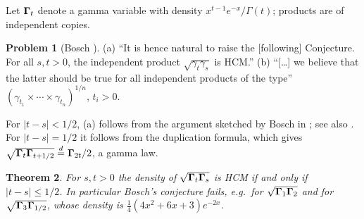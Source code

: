 \documentclass[11pt]{amsart}
\newtheorem{theorem}{Theorem}[section]
\theoremstyle{definition}
\newtheorem{problem}[theorem]{Problem}
\theoremstyle{remark}
\begin{document}
Let $\boldsymbol{\Gamma}_t$ denote a gamma variable with density
$x^{t-1}e^{-x}/\Gamma(t)$; products are of independent copies.

\begin{problem}[{Bosch \cite[Remark~1]{R7-Bosch15}}]\label{R7-prob-bosch}
(a) ``It is hence natural to raise the [following] Conjecture. For all
$s,t>0$, the independent product $\sqrt{\gamma_t\gamma_s}$ is HCM.''
(b) ``[\dots] we believe that the latter should be true for all independent
products of the type'' $(\gamma_{t_1}\times\cdots\times\gamma_{t_n})^{1/n}$,
$t_i>0$.
\end{problem}

For $|t-s|<1/2$, (a) follows from the argument sketched by Bosch in
\cite[Remark~1(a)]{R7-Bosch15}; see also \cite[Section~3.3]{R7-BoschSimon15}.
For $|t-s|=1/2$ it follows from the duplication formula, which gives
$\sqrt{\boldsymbol{\Gamma}_t\boldsymbol{\Gamma}_{t+1/2}}\overset d=\boldsymbol{\Gamma}_{2t}/2$, a gamma law.

\begin{theorem}\label{R7-thm-bosch}
For $s,t>0$ the density of $\sqrt{\boldsymbol{\Gamma}_t\boldsymbol{\Gamma}_s}$ is HCM if and only if
$|t-s|\le1/2$. In particular Bosch's conjecture fails, e.g.\ for
$\sqrt{\boldsymbol{\Gamma}_1\boldsymbol{\Gamma}_2}$ and for $\sqrt{\boldsymbol{\Gamma}_3\boldsymbol{\Gamma}_{1/2}}$, whose
density is $\frac14(4x^2+6x+3)e^{-2x}$.
\end{theorem}
\end{document}
